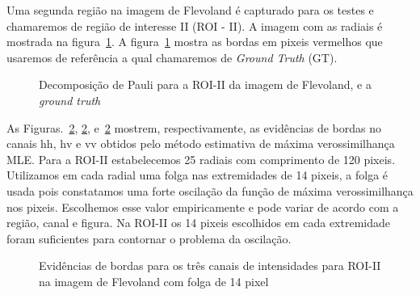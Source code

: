 
Uma segunda região na imagem de Flevoland é capturado para os testes e chamaremos de região de interesse II (ROI - II). A imagem com as radiais é mostrada na figura~\ref{roi_gt_roi_ii}. A figura~\ref{roi_gt_roi_ii} mostra as bordas em pixeis vermelhos que usaremos de referência a qual chamaremos de \textit{Ground Truth} (GT).
\begin{figure}[hbt]
   \centering
    \caption{Decomposição de Pauli para a ROI-II da imagem de Flevoland, e a \textit{ground truth}}
    \label{roi_gt_roi_ii}
\end{figure}

As Figuras.~\ref{evidencias_flev_roi_ii_hh_hv_vv}, \ref{evidencias_flev_roi_ii_hh_hv_vv}, e~\ref{evidencias_flev_roi_ii_hh_hv_vv} mostrem, respectivamente, as evidências de bordas no canais $\text{hh}$, $\text{hv}$ e $\text{vv}$ obtidos pelo método estimativa de máxima verossimilhança MLE. Para a ROI-II estabelecemos 25 radiais com comprimento de 120 pixeis. Utilizamos em cada radial uma folga nas extremidades de  14 pixeis, a folga é usada pois constatamos uma forte oscilação da função de máxima verossimilhança nos pixeis. Escolhemos esse valor empiricamente e pode variar de acordo com a região, canal e figura. Na ROI-II os 14 pixeis escolhidos em cada extremidade foram suficientes para contornar o problema da oscilação.

   \begin{figure}[hbt]
	\centering
     \caption{Evidências de bordas para os três canais de intensidades para ROI-II na imagem de Flevoland com folga de 14 pixel}
     \label{evidencias_flev_roi_ii_hh_hv_vv} 
   \end{figure}

